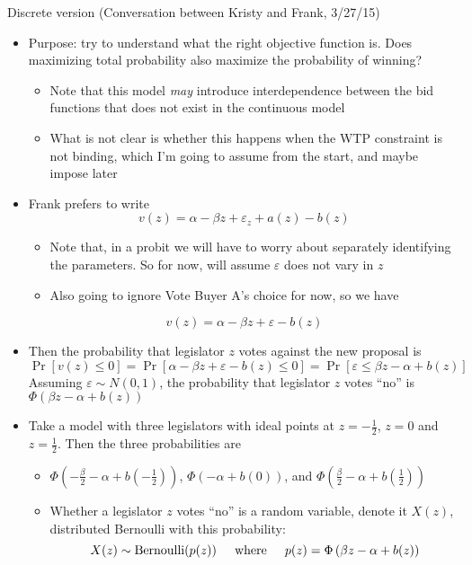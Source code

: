 \documentclass[12pt]{article}
\newcommand{\ve}{\varepsilon}
\begin{document}
\newpage
Discrete version (Conversation between Kristy and Frank, 3/27/15)
\begin{itemize}
	\item Purpose: try to understand what the right objective function is. Does maximizing total probability also maximize the probability of winning?
		\begin{itemize}
			\item Note that this model \textit{may} introduce interdependence between the bid functions that does not exist in the continuous model
			\item What is not clear is whether this happens when the WTP constraint is not binding, which I'm going to assume from the start, and maybe impose later
		\end{itemize}
	\item Frank prefers to write
	  \[
		  v(z) = \alpha -\beta z + \ve_z + a(z) - b(z)
		\]
			\begin{itemize}
				\item Note that, in a probit we will have to worry about separately identifying the parameters. So for now, will assume $\ve$ does not vary in $z$
				\item Also going to ignore Vote Buyer A's choice for now, so we have
			\end{itemize}
	  \[
		  v(z) = \alpha -\beta z + \ve - b(z)
		\]
	\item Then the probability that legislator $z$ votes against the new proposal is
	  \[
		  \Pr\left[v(z)\leq 0 \right] = \Pr\left[\alpha -\beta z + \ve - b(z) \leq 0 \right] 
			                            = \Pr\left[\ve \leq \beta z - \alpha + b(z) \right] 
		\]
		Assuming $\ve \sim N(0,1)$, the probability that legislator $z$ votes ``no'' is $\Phi\left(\beta z - \alpha + b(z) \right)$
	\item Take a model with three legislators with ideal points at $z=-\frac{1}{2}$, $z=0$ and $z=\frac{1}{2}$. Then the three probabilities are
		\begin{itemize}
			\item $\Phi\left(-\frac{\beta}{2} - \alpha + b(-\frac{1}{2}) \right)$, $\Phi\left(- \alpha + b(0) \right)$, and $\Phi\left(\frac{\beta}{2} - \alpha + b(\frac{1}{2}) \right)$
			\item Whether a legislator $z$ votes ``no'' is a random variable, denote it $X(z)$, distributed Bernoulli with this probability:
				\[
				  X(z) \sim \text{Bernoulli}(p(z)) \hskip.2in \text{where} \hskip.2in p(z) = \Phi\left(\beta z - \alpha + b(z) \right)
				\]

\end{itemize}
\end{itemize}
\end{document}
